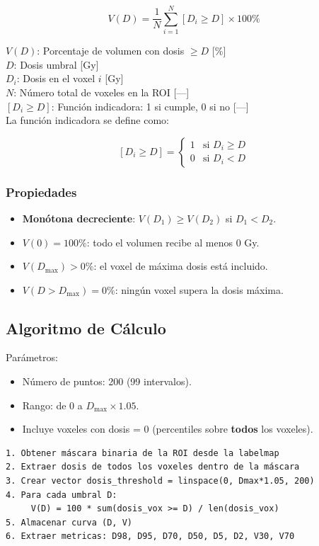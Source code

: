 \documentclass[12pt,a4paper]{article}
\newcommand{\vardef}[2]{\noindent\textbf{#1}: #2\\}
\begin{document}
$$V(D) = \frac{1}{N}\sum_{i=1}^{N} [D_i \geq D] \times 100\%$$

\vardef{$V(D)$}{Porcentaje de volumen con dosis $\geq D$ [\%]}
\vardef{$D$}{Dosis umbral [Gy]}
\vardef{$D_i$}{Dosis en el voxel $i$ [Gy]}
\vardef{$N$}{Número total de voxeles en la ROI [---]}
\vardef{$[D_i \geq D]$}{Función indicadora: 1 si cumple, 0 si no [---]}

La función indicadora se define como:

$$[D_i \geq D] = \begin{cases} 1 & \text{si } D_i \geq D \\ 0 & \text{si } D_i < D \end{cases}$$

\subsubsection{Propiedades}

\begin{itemize}
  \item \textbf{Monótona decreciente}: $V(D_1) \geq V(D_2)$ si $D_1 < D_2$.
  \item \textbf{$V(0) = 100\%$}: todo el volumen recibe al menos 0 Gy.
  \item \textbf{$V(D_{\max}) > 0\%$}: el voxel de máxima dosis está incluido.
  \item \textbf{$V(D > D_{\max}) = 0\%$}: ningún voxel supera la dosis máxima.
\end{itemize}

\subsection{Algoritmo de Cálculo}

Parámetros:
\begin{itemize}
  \item Número de puntos: 200 (99 intervalos).
  \item Rango: de 0 a $D_{\max} \times 1.05$.
  \item Incluye voxeles con dosis = 0 (percentiles sobre \textbf{todos} los voxeles).
\end{itemize}

\begin{verbatim}
1. Obtener máscara binaria de la ROI desde la labelmap
2. Extraer dosis de todos los voxeles dentro de la máscara
3. Crear vector dosis_threshold = linspace(0, Dmax*1.05, 200)
4. Para cada umbral D:
     V(D) = 100 * sum(dosis_vox >= D) / len(dosis_vox)
5. Almacenar curva (D, V)
6. Extraer metricas: D98, D95, D70, D50, D5, D2, V30, V70
\end{verbatim}
\end{document}
